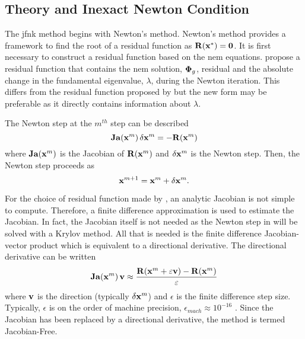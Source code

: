   \subsection{ Theory and Inexact Newton Condition}

    The \gls{jfnk} method begins with Newton's method. Newton's method provides
    a framework to find the root of a residual function as $\mathbf{R}(\mathbf{x}^*) =
    \mathbf{0}$. It is first necessary to construct a residual function based on the
    \gls{nem} equations. \citeauthor{qe2paper} propose a residual function that
    contains the \gls{nem} solution, $\mathbf{\Phi}_g$, residual and the absolute change
    in the fundamental eigenvalue, $\lambda$, during the Newton iteration. This
    differs from the residual function proposed by \citeauthor{gill_azmy} but
    the new form may be preferable as it directly contains information about
    $\lambda$.
    
    The Newton step at the $m^{th}$ step can be described 
    \begin{equation}
      \label{eq:newton_step}
      \mathbf{Ja} (\mathbf{x}^m) \, \delta\mathbf{x}^m = - \mathbf{R}(\mathbf{x}^m)
    \end{equation}
    where $\mathbf{Ja}(\mathbf{x}^m)$ is the Jacobian of $\mathbf{R}(\mathbf{x}^m)$ and 
    $\delta\mathbf{x}^m$ is the Newton step. Then, the Newton step proceeds as
    \begin{equation}
      \mathbf{x}^{m+1} = \mathbf{x}^{m} + \delta\mathbf{x}^{m}.
    \end{equation}

    For the choice of residual function made by \citeauthor{qe2paper}, an 
    analytic Jacobian is not simple to compute. Therefore, a finite difference
    approximation is used to estimate the Jacobian. In fact, the Jacobian itself
    is not needed as the Newton step in  will be solved
    with a Krylov method. All that is needed is the finite difference
    Jacobian-vector product which is equivalent to a directional derivative. The
    directional derivative can be written
    \begin{equation}
      \label{eq:dirder}
      \mathbf{Ja}(\mathbf{x}^m) \, \mathbf{v} \approx \frac{\mathbf{R}(\mathbf{x}^m + \varepsilon \mathbf{v}) - 
        \mathbf{R}(\mathbf{x}^m)}{\varepsilon}
    \end{equation}
    where $\mathbf{v}$ is the direction (typically $\delta\mathbf{x}^m$) and $\epsilon$ is the
    finite difference step size. Typically, $\epsilon$ is on the order of
    machine precision, $\epsilon_{mach} \approx 10^{-16}$
    \cite{qe2paper,gill_azmy,textbookkelley}. Since the Jacobian has been
    replaced by a directional derivative, the method is termed Jacobian-Free.

